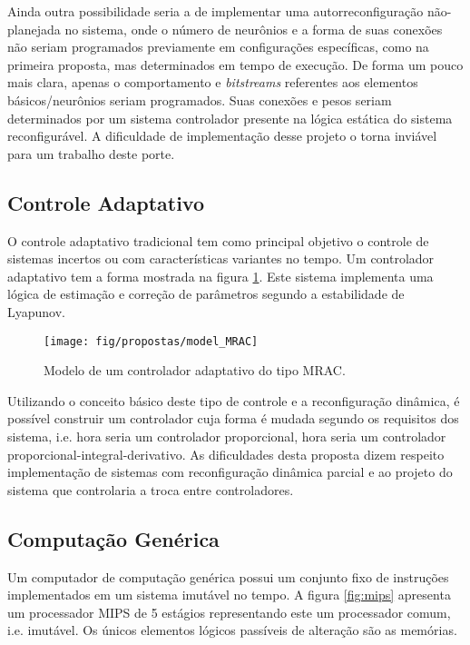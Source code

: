 \documentclass[11pt,a4paper,oneside]{book}
\begin{document}
Ainda outra possibilidade seria a de implementar uma autorreconfigura\c{c}\~ao n\~ao-planejada no sistema, onde o n\'umero de neur\^onios e a forma de suas conex\~oes n\~ao seriam programados previamente em configura\c{c}\~oes específicas, como na primeira proposta, mas determinados em tempo de execu\c{c}\~ao.
De forma um pouco mais clara, apenas o comportamento e \textit{bitstreams} referentes aos elementos b\'asicos/neur\^onios seriam programados.
Suas conex\~oes e pesos seriam determinados por um sistema controlador presente na l\'ogica est\'atica do sistema reconfigur\'avel.
A dificuldade de implementa\c{c}\~ao desse projeto o torna invi\'avel para um trabalho deste porte.

\subsection{Controle Adaptativo}
O controle adaptativo tradicional tem como principal objetivo o controle de sistemas incertos ou com características variantes no tempo.
Um controlador adaptativo tem a forma mostrada na figura \ref{fig:cadapt}.
Este sistema implementa uma l\'ogica de estima\c{c}\~ao e corre\c{c}\~ao de parâmetros segundo a estabilidade de Lyapunov.

\begin{figure}[h]
\centering
\texttt{[image: fig/propostas/model\_MRAC]}
\caption{Modelo de um controlador adaptativo do tipo MRAC.}
\label{fig:cadapt}
\end{figure}

Utilizando o conceito básico deste tipo de controle e a reconfiguração dinâmica, é possível construir um controlador cuja forma é mudada segundo os requisitos dos sistema, i.e. hora seria um controlador proporcional, hora seria um controlador proporcional-integral-derivativo.
As dificuldades desta proposta dizem respeito implementa\c{c}\~ao de sistemas com reconfigura\c{c}\~ao dinâmica parcial e ao projeto do sistema que controlaria a troca entre controladores.

\subsection{Computação Genérica}
Um computador de computação genérica possui um conjunto fixo de instruções implementados em um sistema imutável no tempo.
A figura \ref{fig:mips} apresenta um processador MIPS de 5 estágios representando este um processador comum, i.e. imutável.
Os únicos elementos lógicos passíveis de alteração são as memórias.
\end{document}
